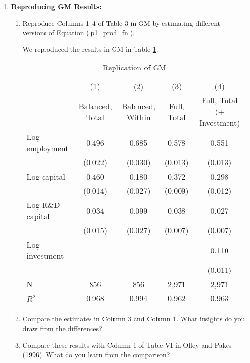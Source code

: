 \documentclass{article}
\begin{document}
\begin{enumerate}
\item \textbf{Reproducing GM Results:}

\begin{enumerate}

\item Reproduce Columns 1–4 of Table 3 in GM by estimating diﬀerent versions of
Equation (\ref{p1_prod_fn}).

\begin{answer}

We reproduced the results in GM in Table \ref{tab:gm_rep}.

\begin{table}[!htb]
\centering
\caption{Replication of GM}
\label{tab:gm_rep}
\begin{tabular}{lcccc}
\toprule
& (1) & (2) & (3) & (4) \\ 
 & Balanced, Total & Balanced, Within & Full, Total & Full, Total (+ Investment) \\
\midrule
Log employment & 0.496 & 0.685 & 0.578 & 0.551 \\
 & (0.022) & (0.030) & (0.013) & (0.013) \\
Log capital & 0.460 & 0.180 & 0.372 & 0.298 \\
 & (0.014) & (0.027) & (0.009) & (0.012) \\
Log R\&D capital & 0.034 & 0.099 & 0.038 & 0.027 \\
 & (0.015) & (0.027) & (0.007) & (0.007) \\
Log investment &  &  &  & 0.110 \\
 &  &  &  & (0.011) \\
 \midrule 
N & 856 & 856 & 2,971 & 2,971 \\
$R^2$ & 0.968 & 0.994 & 0.962 & 0.963 \\
\bottomrule
\end{tabular}
\end{table}

\end{answer}


\item Compare the estimates in Column 3 and Column 1. What insights do you
draw from the differences?




\item Compare these results with Column 1 of Table VI in Olley and Pakes (1996).
What do you learn from the comparison?

\end{enumerate}


\end{enumerate}
\end{document}
